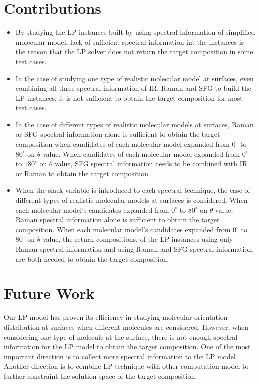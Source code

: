\section{Contributions}
\begin{itemize}
  \item By studying the LP instances built by using spectral information of simplified molecular model, lack of sufficient spectral information int the instances is the reason that the LP solver does not return the target composition in some test cases.
  \item In the case of studying one type of realistic molecular model at surfaces, even combining all three spectral information of IR, Raman and SFG to build the LP instances, it is not sufficient to obtain the target composition for most test cases. 
  \item In the case of different types of realistic molecular models at surfaces, Raman or SFG spectral information alone is sufficient to obtain the target composition when candidates of each molecular model expanded from $0^{\circ}$ to $80^{\circ}$ on $\theta$ value. When candidates of each molecular model expanded from $0^{\circ}$ to $180^{\circ}$ on $\theta$ value, SFG spectral information needs to be combined with IR or Raman to obtain the target composition.
  \item When the slack variable is introduced to each spectral technique, the case of different types of realistic molecular models at surfaces is considered. When each molecular model's candidates expanded from $0^{\circ}$ to $80^{\circ}$ on $\theta$ value, Raman spectral information alone is sufficient to obtain the target composition. When each molecular model's candidates expanded from $0^{\circ}$ to $80^{\circ}$ on $\theta$ value, the return compositions, of the LP instances using only Raman spectral information and using Raman and SFG spectral information, are both needed to obtain the target composition.
\end{itemize}

\section{Future Work}
Our LP model has proven its efficiency in studying molecular orientation distribution at surfaces when different molecules are considered. However, when considering one type of molecule at the surface, there is not enough spectral information for the LP model to obtain the target composition. One of the most important direction is to collect more spectral information to the LP model. Another direction is to combine LP technique with other computation model to further constraint the solution space of the target composition.








